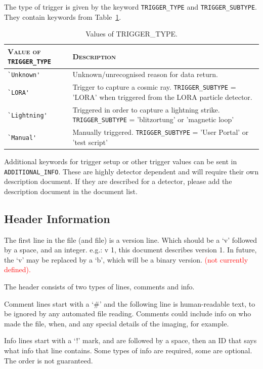 \documentclass[a4paper,10pt,bibtotoc]{scrartcl}
\begin{document}
The type of trigger is given by the keyword \verb|TRIGGER_TYPE| and \verb|TRIGGER_SUBTYPE|. They contain keywords from Table~\ref{tab:trigger_types}.

\begin{table}[htb]
  \centering
  \begin{tabular}{|lp{9cm}|}
    \hline
    \textsc{Value of} \verb|TRIGGER_TYPE| & \textsc{Description} \\
    \hline
    \hline
    \verb|`Unknown'| & Unknown/unrecognised reason for data return. \\
    \verb|`LORA'| & Trigger to capture a cosmic ray. \verb|TRIGGER_SUBTYPE|  = 'LORA' when triggered from the LORA particle detector.\\
    \verb|`Lightning'| & Triggered in order to capture a lightning strike. \verb|TRIGGER_SUBTYPE| = 'blitzortung' or 'magnetic loop' \\
    \verb|`Manual'| & Manually triggered. \verb|TRIGGER_SUBTYPE| = 'User Portal' or 'test script'\\
   \hline
  \end{tabular}
  \caption{Values of TRIGGER\_TYPE.}
  \label{tab:trigger_types}
\end{table}

Additional keywords for trigger setup or other trigger values can be sent in \verb|ADDITIONAL_INFO|. These are highly detector dependent and will require their own description document. If they are described for a detector, please add the description document in the document list.
\subsection{Header Information}


The first line in the file (and file) is a version line. Which should be a ‘v’ followed by a space, and an integer. e.g.:
v 1,  this document describes version 1. In future, the ‘v’ may be replaced by a ‘b’, which will be a binary version. \textcolor{red}{(not currently defined).}

The header consists of two types of lines, comments and info. 

Comment lines start with a ‘\#’ and the following line is human-readable text, to be ignored by any automated file reading. Comments could include info on who made the file, when, and any special details of the imaging, for example.

Info lines start with a ‘!’ mark, and are followed by a space, then an ID that says what info that line contains. Some types of info are required, some are optional. The order is not guaranteed.
\end{document}
